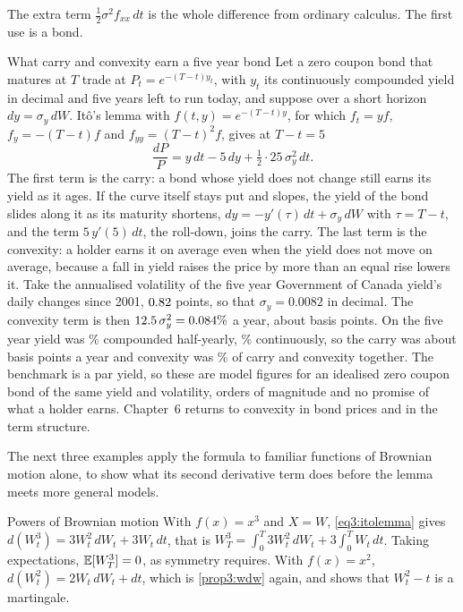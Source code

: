 \begin{chapterrefs}
The extra term $\tfrac12\sigma^2f_{xx}\,dt$ is the whole difference from ordinary calculus. The first
use is a bond.

\begin{example}{What carry and convexity earn a five year bond}\label{ex3:convexity}
Let a zero coupon bond that matures at $T$ trade at $P_t=e^{-(T-t)y_t}$, with $y_t$ its continuously
compounded yield in decimal and five years left to run today, and suppose over a short horizon
$dy=\sigma_y\,dW$. It\^o's lemma with $f(t,y)=e^{-(T-t)y}$, for which $f_t=yf$, $f_y=-(T-t)f$ and
$f_{yy}=(T-t)^2f$, gives at $T-t=5$
\[
\frac{dP}{P}=y\,dt-5\,dy+\tfrac12\cdot25\,\sigma_y^2\,dt .
\]
The first term is the carry: a bond whose yield does not change still earns its yield as it ages. If the
curve itself stays put and slopes, the yield of the bond slides along it as its maturity shortens,
$dy=-y'(\tau)\,dt+\sigma_y\,dW$ with $\tau=T-t$, and the term $5\,y'(5)\,dt$, the roll-down, joins the carry.
The last term is the convexity: a holder earns it on average even when the yield does not move on
average, because a fall in yield raises the price by more than an equal rise lowers it. Take the
annualised volatility of the five year Government of Canada yield's daily changes since 2001,
$0.82$ points, so that $\sigma_y=0.0082$ in decimal. The convexity term is then
$12.5\,\sigma_y^2=0.084\%$ a year, about \canConvexBp{} basis points. On \canYieldEndDate{} the
five year yield was \canYieldEnd\% compounded half-yearly, \canYieldEndCc\% continuously, so the carry
was about \canCarryBp{} basis points a year and convexity was \canConvexShare\% of carry and convexity
together. The benchmark is a par yield, so these are model figures for an idealised zero coupon bond of
the same yield and volatility, orders of magnitude and no promise of what a holder earns. Chapter~6
returns to convexity in bond prices and in the term structure.
\end{example}

The next three examples apply the formula to familiar functions of Brownian motion alone, to show what its second derivative term does before the lemma meets more general models.

\begin{example}{Powers of Brownian motion}\label{ex3:powers}
With $f(x)=x^3$ and $X=W$, \cref{eq3:itolemma} gives $d(W_t^3)=3W_t^2\,dW_t+3W_t\,dt$, that is
$W_T^3=\int_0^T3W_t^2\,dW_t+3\int_0^TW_t\,dt$. Taking expectations, $\mathbb{E}[W_T^3]=0$, as symmetry requires.
With $f(x)=x^2$, $d(W_t^2)=2W_t\,dW_t+dt$, which is \cref{prop3:wdw} again, and shows that $W_t^2-t$ is a
martingale.
\end{example}


\end{chapterrefs}
